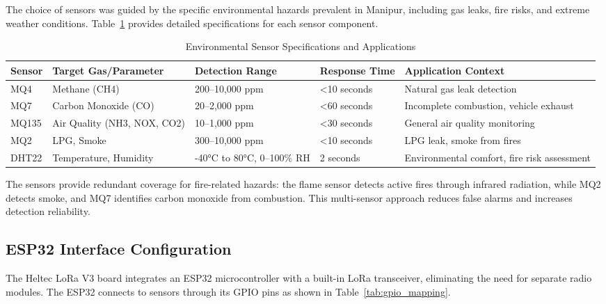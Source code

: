 The choice of sensors was guided by the specific environmental hazards prevalent in Manipur, including gas leaks, fire risks, and extreme weather conditions. Table~\ref{tab:sensor_specs} provides detailed specifications for each sensor component.

\begin{table}[H]
\centering
\caption{Environmental Sensor Specifications and Applications}
\label{tab:sensor_specs}
\begin{tabular}{|p{1cm}|p{3cm}|p{3cm}|p{2cm}|p{4.5cm}|}
\hline
\textbf{Sensor} & \textbf{Target Gas/Parameter} & \textbf{Detection Range} & \textbf{Response Time} & \textbf{Application Context} \\
\hline
MQ4 & Methane (CH4) & 200–10,000 ppm & <10 seconds & Natural gas leak detection \\
\hline
MQ7 & Carbon Monoxide (CO) & 20–2,000 ppm & <60 seconds & Incomplete combustion, vehicle exhaust \\
\hline
MQ135 & Air Quality (NH3, NOX, CO2) & 10–1,000 ppm & <30 seconds & General air quality monitoring \\
\hline
MQ2 & LPG, Smoke & 300–10,000 ppm & <10 seconds & LPG leak, smoke from fires \\
\hline
DHT22 & Temperature, Humidity & -40°C to 80°C, 0–100\% RH & 2 seconds & Environmental comfort, fire risk assessment \\
\hline

\end{tabular}
\end{table}

The sensors provide redundant coverage for fire-related hazards: the flame sensor detects active fires through infrared radiation, while MQ2 detects smoke, and MQ7 identifies carbon monoxide from combustion. This multi-sensor approach reduces false alarms and increases detection reliability.

\subsection{ESP32 Interface Configuration}

The Heltec LoRa V3 board integrates an ESP32 microcontroller with a built-in LoRa transceiver, eliminating the need for separate radio modules. The ESP32 connects to sensors through its GPIO pins as shown in Table~\ref{tab:gpio_mapping}.

